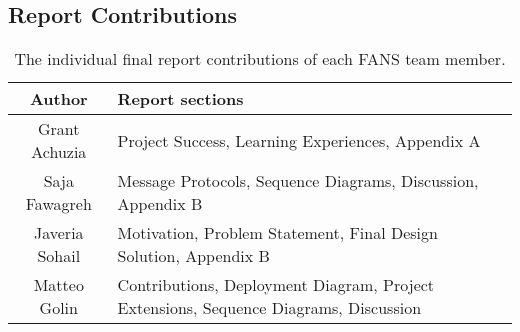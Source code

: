 \subsection{Report Contributions}

\begin{table}[H]
    \centering
    \footnotesize
    \begin{tabular}{| c | p{5in} |}
        \hline
        Author         & Report sections                                                                      \\
        \hline
        Grant Achuzia  & Project Success, Learning Experiences, Appendix A                                    \\
        \hline
        Saja Fawagreh  & Message Protocols, Sequence Diagrams, Discussion, Appendix B                         \\
        \hline
        Javeria Sohail & Motivation, Problem Statement, Final Design Solution, Appendix B                     \\
        \hline
        Matteo Golin   & Contributions, Deployment Diagram, Project Extensions, Sequence Diagrams, Discussion \\
        \hline
    \end{tabular}
    \caption{The individual final report contributions of each FANS team member.}
\end{table}
